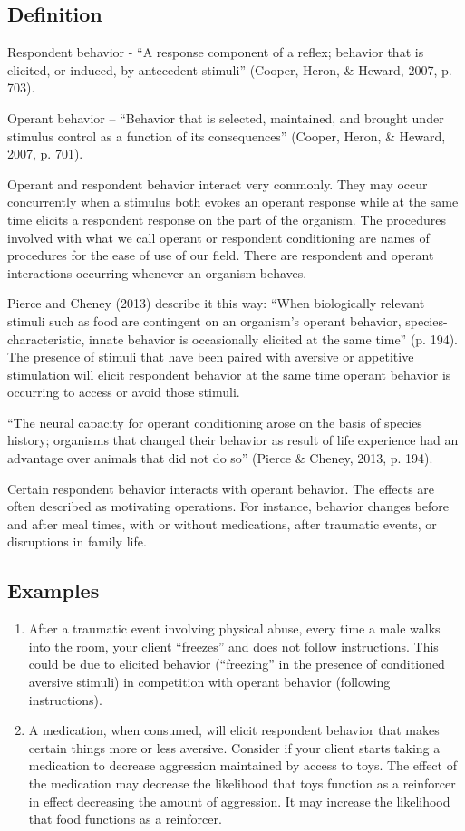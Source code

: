 \subsection{Definition}
Respondent behavior - ``A response component of a reflex; behavior that is elicited, or induced, by antecedent stimuli'' (Cooper, Heron, \& Heward, 2007, p. 703).

Operant behavior – ``Behavior that is selected, maintained, and brought under stimulus control as a function of its consequences'' (Cooper, Heron, \& Heward, 2007, p. 701).

Operant and respondent behavior interact very commonly. They may occur concurrently when a stimulus both evokes an operant response while at the same time elicits a respondent response on the part of the organism. The procedures involved with what we call operant or respondent conditioning are names of procedures for the ease of use of our field. There are respondent and operant interactions occurring whenever an organism behaves. 

Pierce and Cheney (2013) describe it this way: ``When biologically relevant stimuli such as food are contingent on an organism's operant behavior, species-characteristic, innate behavior is occasionally elicited at the same time'' (p. 194). The presence of stimuli that have been paired with aversive or appetitive stimulation will elicit respondent behavior at the same time operant behavior is occurring to access or avoid those stimuli.

``The neural capacity for operant conditioning arose on the basis of species history; organisms that changed their behavior as result of life experience had an advantage over animals that did not do so'' (Pierce \& Cheney, 2013, p. 194).

Certain respondent behavior interacts with operant behavior. The effects are often described as motivating operations. For instance, behavior changes before and after meal times, with or without medications, after traumatic events, or disruptions in family life. 

\subsection{Examples}
\begin{enumerate}
\item  After a traumatic event involving physical abuse, every time a male walks into the room, your client ``freezes'' and does not follow instructions. This could be due to elicited behavior (``freezing'' in the presence of conditioned aversive stimuli) in competition with operant behavior (following instructions).
\item A medication, when consumed, will elicit respondent behavior that makes certain things more or less aversive. Consider if your client starts taking a medication to decrease aggression maintained by access to toys. The effect of the medication may decrease the likelihood that toys function as a reinforcer in effect decreasing the amount of aggression. It may increase the likelihood that food functions as a reinforcer.
\end{enumerate}
%
